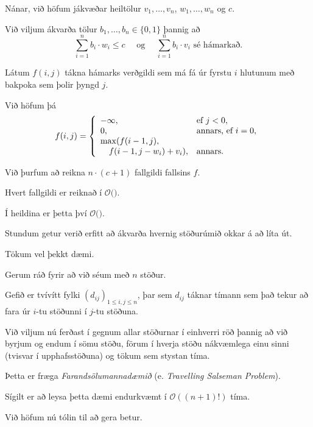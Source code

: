 {
    {
        \item<1-> Nánar, við höfum jákvæðar heiltölur $v_1, \dots, v_n$, $w_1, \dots, w_n$ og $c$.
            \item<2-> Við viljum ákvarða tölur $b_1, \dots, b_n \in \{0, 1\}$ þannig að
            \[
            \sum_{i = 1}^n b_i \cdot w_i \leq c
                \quad \text{ og } \quad
                \sum_{i = 1}^n b_i \cdot v_i \text{ sé hámarkað}.
                \]
                \item<3-> Látum $f(i, j)$ tákna hámarks verðgildi sem má fá úr fyrstu $i$ hlutunum með bakpoka sem þolir þyngd $j$.
                \item<4-> Við höfum þá
                \[
                f(i, j) =
                    \left \{
                    \env{array}
        {
            {l l}
            -\infty, & \text{ef $j < 0$},\\
                0, & \text{annars, ef $i = 0$},\\
                \max(f(i - 1, j), \\
                        \quad f(i - 1, j - w_i) + v_i), & \text{annars}.
        }
        \right .
            \]
    }
}

{
}

{
    {
        \item<1-> Við þurfum að reikna $n \cdot (c + 1)$ fallgildi fallsins $f$.
            \item<2-> Hvert fallgildi er reiknað í $\mathcal{O}($$)$.
            \item<4-> Í heildina er þetta því $\mathcal{O}($$)$.
    }
}

{
    {
        \item<1-> Stundum getur verið erfitt að ákvarða hvernig stöðurúmið okkar á að líta út.
            \item<2-> Tökum vel þekkt dæmi.
            \item<3-> Gerum ráð fyrir að við séum með $n$ stöður.
            \item<4-> Gefið er tvívítt fylki $(d_{ij})_{1 \leq i, j \leq n}$,
            þar sem $d_{ij}$ táknar tímann sem það tekur að fara úr $i$-tu stöðunni í $j$-tu stöðuna.
                \item<5-> Við viljum nú ferðast í gegnum allar stöðurnar í einhverri röð þannig að við	
                byrjum og endum í sömu stöðu, förum í hverja stöðu nákvæmlega einu sinni (tvisvar í upphafsstöðuna) og tökum sem stystan tíma.
                \item<6-> Þetta er fræga \emph{Farandsölumannadæmið} (e. \emph{Travelling Salseman Problem}).
                \item<7-> Sígilt er að leysa þetta dæmi endurkvæmt í $\mathcal{O}((n + 1)!)$ tíma.
                \item<8-> Við höfum nú tólin til að gera betur.
    }
}

